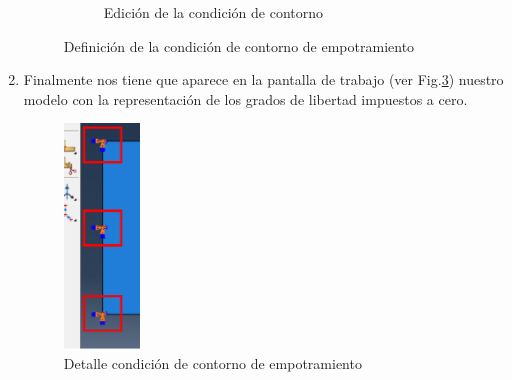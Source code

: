 \begin{enumerate}
\begin{figure}[H]
\begin{subfigure}{0.45\textwidth}
      \caption{Edición de la condición de contorno}
      \label{figu39}
    \end{subfigure}%
    \caption{Definición de la condición de contorno de empotramiento}
  \end{figure}
\item Finalmente nos tiene que aparece en la pantalla de trabajo (ver
  Fig.\ref{figu40}) nuestro modelo con la representación de los grados
  de libertad impuestos a cero.
  \begin{figure}[H]
    \centering
    \includegraphics[width=0.19\textwidth]{./body/images/imagen40.pdf}
    \caption{Detalle condición de contorno de empotramiento}
    \label{figu40}
  \end{figure}
\end{enumerate}


